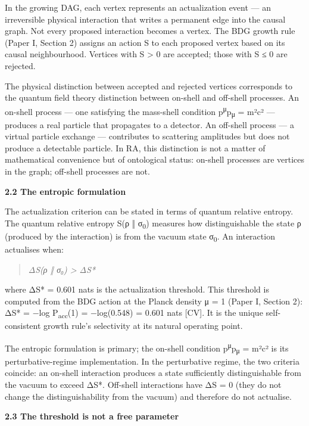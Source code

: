\documentclass[12pt,a4paper]{article}
\begin{document}
In the growing DAG, each vertex represents an actualization event --- an
irreversible physical interaction that writes a permanent edge into the
causal graph. Not every proposed interaction becomes a vertex. The BDG
growth rule (Paper I, Section 2) assigns an action S to each proposed
vertex based on its causal neighbourhood. Vertices with S \textgreater{}
0 are accepted; those with S ≤ 0 are rejected.

The physical distinction between accepted and rejected vertices
corresponds to the quantum field theory distinction between on-shell and
off-shell processes. An on-shell process --- one satisfying the
mass-shell condition p\textsuperscript{μ}p\textsubscript{μ} = m²c² ---
produces a real particle that propagates to a detector. An off-shell
process --- a virtual particle exchange --- contributes to scattering
amplitudes but does not produce a detectable particle. In RA, this
distinction is not a matter of mathematical convenience but of
ontological status: on-shell processes are vertices in the graph;
off-shell processes are not.

\textbf{2.2 The entropic formulation}

The actualization criterion can be stated in terms of quantum relative
entropy. The quantum relative entropy S(ρ ‖ σ\textsubscript{0}) measures
how distinguishable the state ρ (produced by the interaction) is from
the vacuum state σ\textsubscript{0}. An interaction actualises when:

\begin{quote}
\emph{ΔS(ρ ‖ σ₀) \textgreater{} ΔS*}
\end{quote}

where ΔS* = 0.601 nats is the actualization threshold. This threshold is
computed from the BDG action at the Planck density μ = 1 (Paper I,
Section 2): ΔS* = −log P\textsubscript{acc}(1) = −log(0.548) = 0.601
nats {[}CV{]}. It is the unique self-consistent growth rule's
selectivity at its natural operating point.

The entropic formulation is primary; the on-shell condition
p\textsuperscript{μ}p\textsubscript{μ} = m²c² is its perturbative-regime
implementation. In the perturbative regime, the two criteria coincide:
an on-shell interaction produces a state sufficiently distinguishable
from the vacuum to exceed ΔS*. Off-shell interactions have ΔS = 0 (they
do not change the distinguishability from the vacuum) and therefore do
not actualise.

\textbf{2.3 The threshold is not a free parameter}
\end{document}
